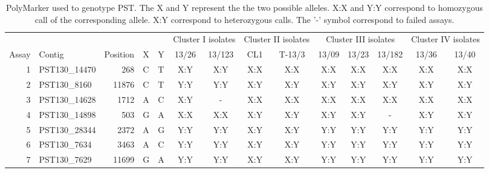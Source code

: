 
\begin{sidewaystable}
\centering
\caption{PolyMarker used to genotype PST. The X and Y represent the the two possible alleles.  X:X and Y:Y correspond to homozygous call of the corresponding allele. X:Y correspond to heterozygous calls. The '-' symbol correspond to failed assays. }
\label{app:PolyMarkerPST}
\begin{localsize}{9}{10}

\begin{tabular}{rlrll|cc|cc|ccc|cc}
\toprule
          &              &  &  & & \multicolumn{2}{c}{Cluster I isolates}        & \multicolumn{2}{c}{Cluster II isolates}        & \multicolumn{3}{c}{Cluster III isolates}         & \multicolumn{2}{c}{Cluster IV isolates}        \\
Assay & Contig       & Position &  X &  Y & 13/26              & 13/123 & CL1                 & T-13/3 & 13/09                & 13/23 & 13/182 & 13/36               & 13/40 \\
 \midrule
  1  & PST130\_14470 & 268      & C        & T        & X:Y                & X:Y    & X:X                 & X:X    & X:X                  & X:X   & X:X    & X:X                 & X:X   \\
  2  & PST130\_8160  & 11876    & C        & T        & Y:Y                & Y:Y    & X:Y                 & X:Y    & X:Y                  & X:Y   & X:Y    & X:Y                 & X:Y   \\
  3  & PST130\_14628 & 1712     & A        & C        & X:Y                & -      & X:X                 & X:X    & X:X                  & X:X   & X:X    & X:X                 & X:X   \\
  4  & PST130\_14898 & 503      & G        & A        & X:X                & X:X    & X:Y                 & X:Y    & X:Y                  & X:Y   & -      & X:Y                 & X:Y   \\
  5  & PST130\_28344 & 2372     & A        & G        & Y:Y                & Y:Y    & X:Y                 & X:Y    & Y:Y                  & Y:Y   & Y:Y    & Y:Y                 & Y:Y   \\
  6  & PST130\_7634  & 3463     & A        & C        & Y:Y                & Y:Y    & X:Y                 & X:Y    & Y:Y                  & Y:Y   & Y:Y    & Y:Y                 & Y:Y   \\
  7  & PST130\_7629  & 11699    & G        & A        & Y:Y                & Y:Y    & X:Y                 & X:Y    & Y:Y                  & Y:Y   & Y:Y    & Y:Y                 & Y:Y   \\

\end{tabular}
\end{localsize}
\end{sidewaystable}
